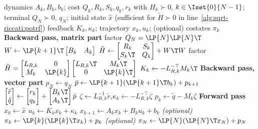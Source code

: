 \begin{algorithm}[H]
\caption{Square-root Riccati recursion --- Cholesky form}
\label{alg:sqrt-riccati}
\begin{algorithmic}[1]
\Require dynamics $A_k, B_k, b_k$; cost $Q_k, R_k, S_k, q_k, r_k$ with $H_k \succ 0$, $k \in \Iset{0}{N-1}$;
         terminal $Q_N \succ 0$, $q_N$; initial state $\hat{x}$
         (sufficient for $\tilde{H} \succ 0$ in line~\ref{alg:sqrt-riccati:potrf})
\Ensure feedback $K_k, \kappa_k$; trajectory $x_k, u_k$; (optional) costates $\pi_k$
\Statex \textbf{Backward pass, matrix part}
\State factor $Q_N = \LP{N} \LP{N}\T$
\State $W \gets \LP{k+1}\T \begin{bmatrix} B_k & A_k \end{bmatrix}$
\State $\tilde{H} \gets
\begin{bmatrix} R_k & S_k \\ S_k\T & Q_k \end{bmatrix} + W\T W$
\State factor $\tilde{H} =
\begin{bmatrix} L_{R,k} & 0 \\ M_k & \LP{k} \end{bmatrix}
\begin{bmatrix} L_{R,k}\T & M_k\T \\ 0 & \LP{k}\T \end{bmatrix}$
\label{alg:sqrt-riccati:potrf}
\State $K_k \gets -L_{R,k}^{-\top} M_k\T$
\EndFor
\Statex \textbf{Backward pass, vector part}
\State $p_N \gets q_N$
\State $\bar{p} \gets \LP{k+1}\!\left(\LP{k+1}\T b_k\right) + p_{k+1}$
\State $\begin{bmatrix} \tilde r \\ \tilde q \end{bmatrix} \gets
\begin{bmatrix} r_k \\ q_k \end{bmatrix}
+ \begin{bmatrix} B_k\T \\ A_k\T \end{bmatrix} \bar{p}$
\State $\zeta \gets L_{R,k}^{-1}\tilde r$,\quad $\kappa_k \gets -L_{R,k}^{-\top} \zeta$
\State $p_k \gets \tilde q - M_k\zeta$
\EndFor
\Statex \textbf{Forward pass}
\State $x_0 \gets \hat{x}$
\State $u_k \gets K_k x_k + \kappa_k$
\State $x_{k+1} \gets A_k x_k + B_k u_k + b_k$
\State \textit{(optional)}\; $\pi_k \gets \LP{k}\!\left(\LP{k}\T x_k\right) + p_k$
\EndFor
\State \textit{(optional)}\; $\pi_N \gets \LP{N}\!\left(\LP{N}\T x_N\right) + p_N$
\end{algorithmic}
\end{algorithm}

